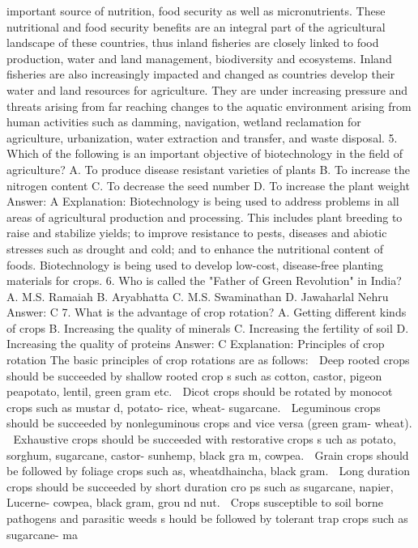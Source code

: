 important source of nutrition, food security as well as
micronutrients. These nutritional and food security benefits are an
integral part of the agricultural landscape of these countries, thus
inland fisheries are closely linked to food production, water and land
management, biodiversity and ecosystems.
Inland fisheries are also increasingly impacted and changed as
countries develop their water and land resources for
agriculture. They are under increasing pressure and threats arising
from far reaching changes to the aquatic environment arising from
human activities such as damming, navigation, wetland reclamation
for agriculture, urbanization, water extraction and transfer, and
waste disposal.
5. Which of the following is an important objective of
biotechnology in the field of agriculture?
A. To produce disease resistant varieties of plants
B. To increase the nitrogen content
C. To decrease the seed number
D. To increase the plant weight
Answer: A
Explanation: Biotechnology is being used to address problems in all
areas of agricultural production and processing. This includes plant
breeding to raise and stabilize yields; to improve resistance to
pests, diseases and abiotic stresses such as drought and cold; and to
enhance the nutritional content of foods. Biotechnology is being used
to develop low-cost, disease-free planting materials for crops.
6. Who is called the "Father of Green Revolution" in India?
A. M.S. Ramaiah
B. Aryabhatta
C. M.S. Swaminathan
D. Jawaharlal Nehru
Answer: C
7. What is the advantage of crop rotation?
A. Getting different kinds of crops
B. Increasing the quality of minerals
C. Increasing the fertility of soil
D. Increasing the quality of proteins
Answer: C
Explanation: Principles of crop rotation
The basic principles of crop rotations are as follows:
 Deep rooted crops should be succeeded by shallow rooted crop
s such as cotton, castor, pigeon peapotato, lentil, green gram etc.
 Dicot crops should be rotated by monocot crops such as mustar
d, potato- rice, wheat- sugarcane.
 Leguminous crops should be succeeded by nonleguminous crops and vice versa (green gram- wheat).
 Exhaustive crops should be succeeded with restorative crops s
uch as potato, sorghum, sugarcane, castor- sunhemp, black gra
m, cowpea.
 Grain crops should be followed by foliage crops such as, wheatdhaincha, black gram.
 Long duration crops should be succeeded by short duration cro
ps such as sugarcane, napier, Lucerne- cowpea, black gram, grou
nd nut.
 Crops susceptible to soil borne pathogens and parasitic weeds s
hould be followed by tolerant trap crops such as sugarcane- ma

